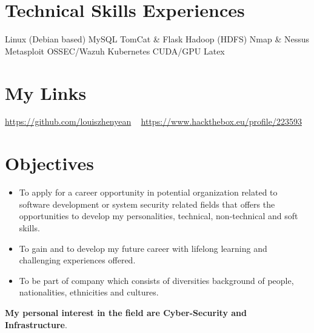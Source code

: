 \documentclass[English]{cv-style}
\begin{document}
\begin{aside}
\section{Technical Skills Experiences}\vspace{0.15cm}
Linux (Debian based)
MySQL
TomCat \& Flask
Hadoop (HDFS)
Nmap \& Nessus
Metasploit
OSSEC/Wazuh
Kubernetes
CUDA/GPU
Latex
\section{My Links}\vspace{0.15cm}
\url{https://github.com/louiszhenyean}
~
\url{https://www.hackthebox.eu/profile/223593}
\end{aside}
\vspace{0.2cm}
\section{Objectives}
\vspace{-0.2cm}
    \begin{itemize}[noitemsep]
        \item To apply for a career opportunity in potential organization related to software development or system security related fields that offers the opportunities to develop my personalities, technical, non-technical and soft skills. 
        \item To gain and to develop my future career with lifelong learning and challenging experiences offered.
        \item To be part of company which consists of diversities background of people, nationalities, ethnicities and cultures.
    \end{itemize}
\textbf{My personal interest in the field are Cyber-Security and Infrastructure}. 
\end{document}
